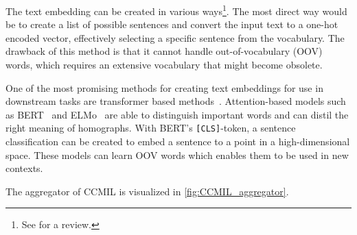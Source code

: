 The text embedding can be created in various ways\footnote{See \textcite{Khattak2019} for a review.}.
The most direct way would be to create a list of possible sentences and convert the input text to a one-hot encoded vector, effectively selecting a specific sentence from the vocabulary.
The drawback of this method is that it cannot handle out-of-vocabulary (OOV) words, which requires an extensive vocabulary that might become obsolete.

One of the most promising methods for creating text embeddings for use in downstream tasks are transformer based methods~\cite{Vaswani2017}.
Attention-based models such as BERT~\cite{Devlin2018} and ELMo~\cite{Peters2018} are able to distinguish important words and can distil the right meaning of homographs.
With BERT's \texttt{[CLS]}-token, a sentence classification can be created to embed a sentence to a point in a high-dimensional space.
These models can learn OOV words which enables them to be used in new contexts.

The aggregator of CCMIL is visualized in \cref{fig:CCMIL_aggregator}.

\begin{figure*}
    \centering
    
    \caption[Clinical Context Multi-Instance Learning aggregator.]{
            Clinical Context Multi-Instance Learning (CCMIL) aggregator.
            Just like in Variance MIL (VarMIL), tile features are presented to a multi-layer perceptron (MLP) to learn attention weights per tile.
            The attention weights are multiplied with their corresponding tile features to get attention-weighted tile features.
            From these, the mean $\mu$ and variance $\sigma^2$ are calculated and concatenated.
            Extending VarMIL, CCMIL further concatenates a text embedding that may contain clinical context of the input image.
            The aggregate is further processed in another MLP for classification.
        }
    \label{fig:CCMIL_aggregator}
\end{figure*}


